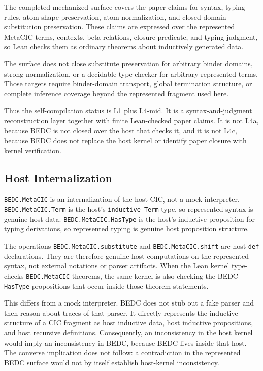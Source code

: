 The completed mechanized surface covers the paper claims for syntax, typing
rules, atom-shape preservation, atom normalization, and closed-domain
substitution preservation. These claims are expressed over the represented
MetaCIC terms, contexts, beta relations, closure predicate, and typing
judgment, so Lean checks them as ordinary theorems about inductively generated
data.

The surface does not close substitute preservation for arbitrary binder
domains, strong normalization, or a decidable type checker for arbitrary
represented terms. Those targets require binder-domain transport, global
termination structure, or complete inference coverage beyond the represented
fragment used here.

Thus the self-compilation status is L1 plus L4-mid. It is a syntax-and-judgment
reconstruction layer together with finite Lean-checked paper claims. It is not
L4a, because BEDC is not closed over the host that checks it, and it is not
L4c, because BEDC does not replace the host kernel or identify paper closure
with kernel verification.





\subsection{Host Internalization}\label{subsec:reconstruction-host-internalization}

\texttt{BEDC.MetaCIC} is an internalization of the host CIC, not a mock
interpreter. \texttt{BEDC.MetaCIC.Term} is the host's
\texttt{inductive Term} type, so represented syntax is genuine host data.
\texttt{BEDC.MetaCIC.HasType} is the host's inductive proposition for typing
derivations, so represented typing is genuine host proposition structure.

The operations \texttt{BEDC.MetaCIC.substitute} and
\texttt{BEDC.MetaCIC.shift} are host \texttt{def} declarations. They are
therefore genuine host computations on the represented syntax, not external
notations or parser artifacts. When the Lean kernel type-checks
\texttt{BEDC.MetaCIC} theorems, the same kernel is also checking the BEDC
\texttt{HasType} propositions that occur inside those theorem statements.

This differs from a mock interpreter. BEDC does not stub out a fake parser and
then reason about traces of that parser. It directly represents the inductive
structure of a CIC fragment as host inductive data, host inductive
propositions, and host recursive definitions. Consequently, an inconsistency
in the host kernel would imply an inconsistency in BEDC, because BEDC lives
inside that host. The converse implication does not follow: a contradiction in
the represented BEDC surface would not by itself establish host-kernel
inconsistency.


